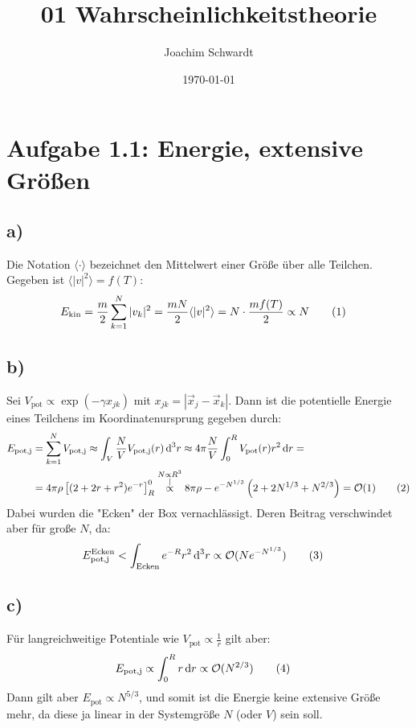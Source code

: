 \documentclass[a4paper,12pt]{article}
\newcommand\numberthis{\addtocounter{equation}{1}\tag{\theequation}}
\newcommand{\bra}{}
\newcommand{\kom}{}
\newcommand{\intx}{}
\newcommand{\intr}{}
\newcommand{\kla}{}
\newcommand{\klam}{}
\newcommand{\tecxt}{}
\begin{document}
\title{01 Wahrscheinlichkeitstheorie}
\author{Joachim Schwardt}
\date{\today}
\maketitle

\section*{Aufgabe 1.1: Energie, extensive Größen}
\subsection*{a)}
Die Notation $\bra\langle {\cdot }\rangle$ bezeichnet den Mittelwert einer Größe über alle Teilchen. Gegeben ist $\bra\langle {|v|^2}\rangle=f(T)$:
\begin{align*}
E_\tecxt\text{kin}&=\frac{m}{2}\sum_{k=1}^N|v_k|^2=\frac{mN}{2}\bra\langle {|v|^2}\rangle = N\cdot\frac{mf(T)}{2}\propto N\numberthis\label{Kinetische Energie ist extensiv}
\end{align*}
\subsection*{b)}
Sei $V_\tecxt\text{pot}\propto\exp(-\gamma x_{jk})$ mit $x_{jk}=|\vec{x}_j-\vec{x}_k|$. Dann ist die potentielle Energie eines Teilchens im Koordinatenursprung gegeben durch:
\begin{align*}
E_\tecxt\text{pot,j}&=\sum_{k=1}^NV_\tecxt\text{pot,j}\approx\intr\int_{V}{\frac{N}{V}V_\tecxt\text{pot,j}(r)}\,\mathrm{d}^{3}r\approx 4\pi\frac{N}{V}\intx\int_{0}^{R}V_\tecxt\text{pot}(r)r^2\,\mathrm{d}r=\\
&=4\pi\rho\klam\left[ {(2+2r+r^2)e^{-r}} \right]_R^0\kom\overset{\substack{{N\propto R^3} \\ |}}{\propto}8\pi\rho-e^{-N^{1/3}}\kla\left( {2+2N^{1/3}+N^{2/3}} \right)=\mathcal{O}(1)\numberthis\label{Potentielle Energie fuer exp von r}
\end{align*}
Dabei wurden die "Ecken" der Box vernachlässigt. Deren Beitrag verschwindet aber für große $N$, da:
\begin{align*}
E_\tecxt\text{pot,j}^\tecxt\text{Ecken}&<\intr\int_{\tecxt\text{Ecken}}{e^{-R}r^2}\,\mathrm{d}^{3}r\propto\mathcal{O}(Ne^{-N^{1/3}})\numberthis\label{Potentielle Energie mit Ecken}
\end{align*}
\subsection*{c)}
Für langreichweitige Potentiale wie $V_\tecxt\text{pot}\propto\frac{1}{r}$ gilt aber:
\begin{align*}
E_\tecxt\text{pot,j}&\propto\intx\int_{0}^{R}r\,\mathrm{d}r\propto\mathcal{O}(N^{2/3})\numberthis\label{Potentielle Energie Gravitation}
\end{align*}
Dann gilt aber $E_\tecxt\text{pot}\propto N^{5/3}$, und somit ist die Energie keine extensive Größe mehr, da diese ja linear in der Systemgröße $N$ (oder $V$) sein soll.
\end{document}
